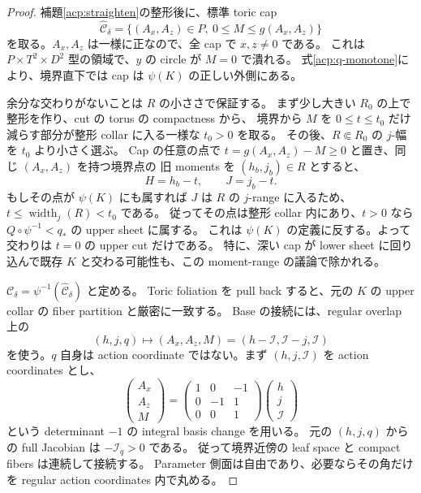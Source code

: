 \begin{proof}
補題\ref{acp:straighten}の整形後に、標準 toric cap
\begin{equation}\label{acp:toric-cap}
 \widehat{\mathcal C}_\delta
 =\{(A_x,A_z)\in P,\ 0\le M\le g(A_x,A_z)\}
\end{equation}
を取る。$A_x,A_z$ は一様に正なので、全 cap で $x,z\ne0$ である。
これは $P\times T^2\times D^2$ 型の領域で、$y$ の circle が $M=0$ で潰れる。
式\eqref{acp:q-monotone}により、境界直下では cap は $\psi(K)$ の正しい外側にある。

余分な交わりがないことは $R$ の小ささで保証する。
まず少し大きい $R_0$ の上で整形を作り、cut の torus の compactness から、
境界から $M$ を $0\le t\le t_0$ だけ減らす部分が整形 collar に入る一様な $t_0>0$ を取る。
その後、$R\Subset R_0$ の $j$-幅を $t_0$ より小さく選ぶ。
Cap の任意の点で $t=g(A_x,A_z)-M\ge0$ と置き、同じ $(A_x,A_z)$ を持つ境界点の
旧 moments を $(h_b,j_b)\in R$ とすると、
\begin{equation}\label{acp:moment-exit}
 H=h_b-t,\qquad J=j_b-t.
\end{equation}
もしその点が $\psi(K)$ にも属すれば $J$ は $R$ の $j$-range に入るため、
$t\le\operatorname{width}_j(R)<t_0$ である。
従ってその点は整形 collar 内にあり、$t>0$ なら $Q\circ\psi^{-1}<q_*$ の upper sheet に属する。
これは $\psi(K)$ の定義に反する。よって交わりは $t=0$ の upper cut だけである。
特に、深い cap が lower sheet に回り込んで既存 $K$ と交わる可能性も、この moment-range の議論で除かれる。

$\mathcal C_\delta=\psi^{-1}(\widehat{\mathcal C}_\delta)$ と定める。
Toric foliation を pull back すると、元の $K$ の upper collar の fiber partition と厳密に一致する。
Base の接続には、regular overlap 上の
\[
 (h,j,q)\longmapsto
 (A_x,A_z,M)=(h-\mathcal I,\mathcal I-j,\mathcal I)
\]
を使う。$q$ 自身は action coordinate ではない。まず $(h,j,\mathcal I)$ を action coordinates とし、
\[
 \begin{pmatrix}A_x\\ A_z\\ M\end{pmatrix}
 =\begin{pmatrix}1&0&-1\\0&-1&1\\0&0&1\end{pmatrix}
 \begin{pmatrix}h\\j\\\mathcal I\end{pmatrix}
\]
という determinant $-1$ の integral basis change を用いる。
元の $(h,j,q)$ からの full Jacobian は $-\mathcal I_q>0$ である。
従って境界近傍の leaf space と compact fibers は連続して接続する。
Parameter 側面は自由であり、必要ならその角だけを regular action coordinates 内で丸める。


\end{proof}
